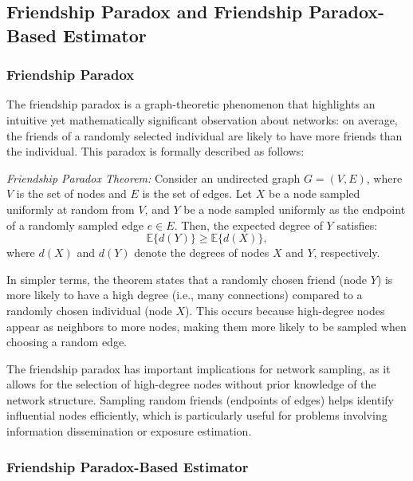\documentclass{article}
\begin{document}
\subsection{Friendship Paradox and Friendship Paradox-Based Estimator}

\subsubsection{Friendship Paradox}

The friendship paradox is a graph-theoretic phenomenon that highlights an intuitive yet mathematically significant observation about networks: on average, the friends of a randomly selected individual are likely to have more friends than the individual. This paradox is formally described as follows:

\noindent\textit{Friendship Paradox Theorem:} Consider an undirected graph \( G = (V, E) \), where \( V \) is the set of nodes and \( E \) is the set of edges. Let \( X \) be a node sampled uniformly at random from \( V \), and \( Y \) be a node sampled uniformly as the endpoint of a randomly sampled edge \( e \in E \). Then, the expected degree of \( Y \) satisfies:
\[
\mathbb{E}\{d(Y)\} \geq \mathbb{E}\{d(X)\},
\]
where \( d(X) \) and \( d(Y) \) denote the degrees of nodes \( X \) and \( Y \), respectively.

In simpler terms, the theorem states that a randomly chosen friend (node \( Y \)) is more likely to have a high degree (i.e., many connections) compared to a randomly chosen individual (node \( X \)). This occurs because high-degree nodes appear as neighbors to more nodes, making them more likely to be sampled when choosing a random edge.

The friendship paradox has important implications for network sampling, as it allows for the selection of high-degree nodes without prior knowledge of the network structure. Sampling random friends (endpoints of edges) helps identify influential nodes efficiently, which is particularly useful for problems involving information dissemination or exposure estimation.

\subsubsection{Friendship Paradox-Based Estimator}
\end{document}

